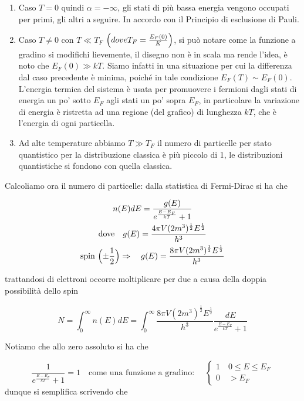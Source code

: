 \begin{enumerate}[label=(\alph*)]
\item Caso $T = 0$ quindi $\alpha = - \infty$,  gli stati di più bassa energia vengono occupati per primi, gli altri a seguire. 
In accordo con il Principio di esclusione di Pauli.
\item Caso $T \not = 0$  con $T \ll T_F$ \quad $\Bigl( dove T_F = \frac{ E_F(0)}{K }   \Bigr)$, si può notare come la funzione a gradino si modifichi lievemente,
il disegno non è in scala ma rende l'idea, è noto che $E_F(0) \gg kT$.
Siamo infatti in una situazione per cui la differenza dal caso precedente è minima, poiché in tale condizione $E_F(T) \sim E_F(0)$.
L'energia termica del sistema è usata per promuovere i fermioni dagli stati di energia un po' sotto $E_F$ agli stati un po' sopra $E_F$, 
in particolare la variazione di energia è ristretta ad una regione (del grafico) di lunghezza $kT$, che è l'energia di ogni particella.
\item Ad alte temperature abbiamo $T \gg T_F$ il numero di particelle per stato quantistico per la distribuzione classica è più piccolo di 1,
le distribuzioni quantistiche si fondono con quella classica.
\end{enumerate}

Calcoliamo ora il numero di particelle: dalla statistica di Fermi-Dirac si ha che

\begin{gather*} 
n(E)dE = \frac{ g(E)}{e^{ \frac{ E - E_F}{kT } } + 1 } \\
\mbox{dove} \quad g(E)= \frac{4 \pi V (2m^3)^{\frac{1}{2}} E^{\frac{1}{2}}}{h^3} \\
\mbox{spin } \Bigl(  \pm \frac{ 1}{2 }  \Bigr) \Rightarrow \quad g(E)= \frac{8 \pi V (2m^3)^{\frac{1}{2}} E^{\frac{1}{2}}}{h^3}
\end{gather*}

trattandosi di elettroni occorre moltiplicare per due a causa della doppia possibilità dello spin

\begin{equation}
N = \int_0^{\infty} n(E)dE = \int_0^{\infty} \frac{8 \pi V (2m^3)^{\frac{1}{2}} E^{\frac{1}{2}}}{h^3} \frac{ dE}{e^{ \frac{ E-E_F}{kT } } + 1 }
\end{equation}

Notiamo che allo zero assoluto si ha che 

\begin{equation}
\frac{ 1 }{e^{ \frac{ E - E_F}{kT } } + 1 } = 1 \quad
\mbox{come una funzione a gradino: } \quad
\begin{cases}
	1 \quad 0 \le E \le E_F \\
	0 \quad > E_F
\end{cases}
\end{equation}
dunque si semplifica scrivendo che 

